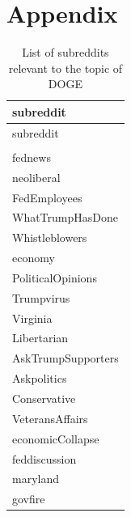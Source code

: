 \documentclass[
  12pt]{article}
\begin{document}
\newpage

\section{Appendix}\label{appendix}

\begin{longtable}[]{@{}l@{}}
\caption{List of subreddits relevant to the topic of
DOGE}\tabularnewline
\toprule\noalign{}
subreddit \\
\midrule\noalign{}
\endfirsthead
\toprule\noalign{}
subreddit \\
\midrule\noalign{}
\endhead
\bottomrule\noalign{}
\endlastfoot
50501 \\
fednews \\
neoliberal \\
FedEmployees \\
WhatTrumpHasDone \\
Whistleblowers \\
economy \\
PoliticalOpinions \\
Trumpvirus \\
Virginia \\
Libertarian \\
AskTrumpSupporters \\
Askpolitics \\
Conservative \\
VeteransAffairs \\
economicCollapse \\
feddiscussion \\
maryland \\
govfire \\
\end{longtable}
\end{document}
